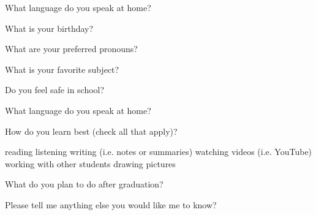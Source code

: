 \documentclass{exam}
\begin{document}
\begin{questions}

\question What language do you speak at home? \fillin    

\question What is your birthday? \fillin    

\question What are your preferred pronouns? \fillin    

\question What is your favorite subject? \fillin
    
\question Do you feel safe in school? \fillin

\question What language do you speak at home? \fillin


\question How do you learn best (check all that apply)?  
\begin{checkboxes}
    \choice reading
    \choice listening
    \choice writing (i.e. notes or summaries)
    \choice watching videos (i.e. YouTube)
    \choice working with other students
    \choice drawing pictures
\end{checkboxes}


\question What do you plan to do after graduation?  
\makeemptybox{1in}

\vspace{1cm}

\question Please tell me anything else you would like me to know?  





\end{questions}
\end{document}
